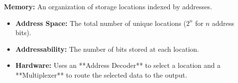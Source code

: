\begin{definition}
\textbf{Memory:} An organization of storage locations indexed by addresses. 
\begin{itemize}
    \item \textbf{Address Space:} The total number of unique locations ($2^n$ for $n$ address bits).
    \item \textbf{Addressability:} The number of bits stored at each location.
    \item \textbf{Hardware:} Uses an **Address Decoder** to select a location and a **Multiplexer** to route the selected data to the output.
\end{itemize}
\end{definition}